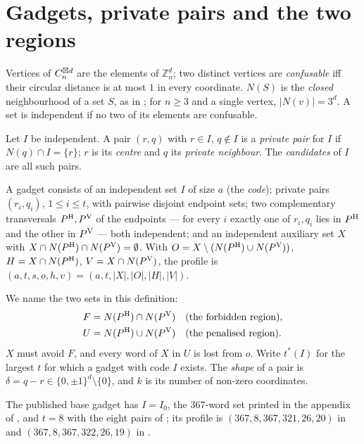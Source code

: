 \section{Gadgets, private pairs and the two regions}
\label{sec:defs}

Vertices of $C_n^{\boxtimes d}$ are the elements of $\mathbb{Z}_n^d$; two distinct vertices are
\emph{confusable} iff their circular distance is at most $1$ in every coordinate. $N(S)$ is the
\emph{closed} neighbourhood of a set $S$, as in \cite{gao2026,tandon2026}; for $n\ge3$ and a
single vertex, $|N(v)|=3^d$. A set is independent if no two of its elements are confusable.

\begin{definition}
\label{def:pair}
Let $I$ be independent. A pair $(r,q)$ with $r\in I$, $q\notin I$ is a \emph{private pair} for
$I$ if $N(q)\cap I=\{r\}$; $r$ is its \emph{centre} and $q$ its \emph{private neighbour}. The
\emph{candidates} of $I$ are all such pairs.
\end{definition}

\begin{definition}
\label{def:gadget}
A gadget consists of an independent set $I$ of size $a$ (the \emph{code}); private pairs
$(r_i,q_i)$, $1\le i\le t$, with pairwise disjoint endpoint sets; two complementary transversals
$P^{\mathrm H},P^{\mathrm V}$ of the endpoints --- for every $i$ exactly one of $r_i,q_i$ lies in $P^{\mathrm H}$ and the other in
$P^{\mathrm V}$ --- both independent; and an independent auxiliary set $X$ with
$X\cap N(P^{\mathrm H})\cap N(P^{\mathrm V})=\emptyset$. With $O=X\setminus(N(P^{\mathrm H})\cup N(P^{\mathrm V}))$, $H=X\cap N(P^{\mathrm H})$,
$V=X\cap N(P^{\mathrm V})$, the profile is $(a,t,s,o,h,v)=(a,t,|X|,|O|,|H|,|V|)$.
\end{definition}

We name the two sets in this definition:
\begin{align*}
  F&=N(P^{\mathrm H})\cap N(P^{\mathrm V}) && \text{(the forbidden region)},\\
  U&=N(P^{\mathrm H})\cup N(P^{\mathrm V}) && \text{(the penalised region)}.
\end{align*}
$X$ must avoid $F$, and every word of $X$ in $U$ is lost from $o$. Write $t^*(I)$ for the
largest $t$ for which a gadget with code $I$ exists. The \emph{shape} of a pair is
$\delta=q-r\in\{0,\pm1\}^d\setminus\{0\}$, and $k$ is its number of non-zero coordinates.

The published base gadget has $I=I_0$, the $367$-word set printed in the appendix of
\cite{polak2019}, and $t=8$ with the eight pairs of \cite{itty2026}; its profile is
$(367,8,367,321,26,20)$ in \cite{gao2026} and $(367,8,367,322,26,19)$ in \cite{bpz2026,tandon2026}.


